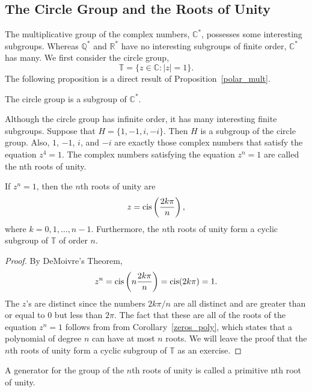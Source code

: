  
\subsection*{The Circle Group and the Roots of Unity }
 
 
The multiplicative group of the complex numbers, ${\mathbb C}^*$,
possesses some interesting subgroups.  Whereas ${\mathbb Q}^*$ and ${\mathbb
R}^*$ have no interesting subgroups of finite order, ${\mathbb C}^*$ has 
many. We first consider the {\bfi circle group}, 
\[
{\mathbb T}\label{notecirclegroup} = \{ z \in {\mathbb C} : |z| = 1 \}.
\]
The following proposition is a direct result of Proposition~\ref{polar_mult}.
 
 
\begin{proposition}
The circle group is a subgroup of  ${\mathbb C}^*$.
\end{proposition}
 
 
Although the circle group has infinite order, it has many interesting 
finite subgroups. Suppose that $H = \{ 1, -1, i, -i \}$. Then $H$ is a
subgroup of the circle group. Also, $1$, $-1$, $i$, and $-i$ are
exactly those complex numbers that satisfy the equation $z^4=1$. 
The complex numbers satisfying the equation $z^n=1$ are called
the {\bfi nth roots of unity}. 
 
 
\begin{theorem}
If $z^n = 1$, then the $n$th roots of unity are
\[
z = \operatorname{cis}\left( \frac{2 k \pi}{n } \right),
\]
where $k = 0, 1, \ldots, n-1$. Furthermore, the $n$th roots of unity
form a cyclic subgroup of\/ ${\mathbb T}$ of order $n$. 
\end{theorem}
 
 
\begin{proof}
By DeMoivre's Theorem,
\[
z^n = \operatorname{cis} \left( n \frac{2 k \pi}{n } \right) =
\operatorname{cis}( 2 k \pi ) = 1.
\]
The $z$'s are distinct since the numbers $2 k \pi /n$ are all
distinct and are greater than or equal to 0 but less than $2 \pi$.
The fact that these are all of the roots of the equation $z^n=1$
follows from from Corollary~\ref{zeros_poly}, which
states that a polynomial of degree $n$ can have at most $n$ roots.  We
will leave the proof that the $n$th roots of unity form a cyclic
subgroup of ${\mathbb T}$ as an exercise.
\end{proof}
 
 
\medskip
 
 
A generator for the group of the $n$th roots of unity is called a
{\bfi primitive nth root of unity}. 
 
